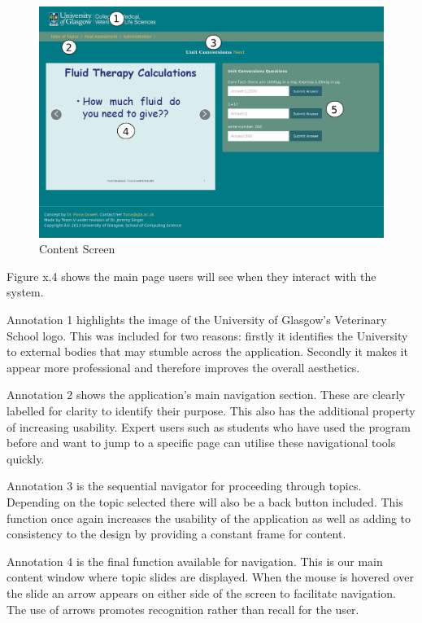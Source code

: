 \documentclass{l3proj}
\begin{document}
\begin{figure}[!htb]
\caption{Content Screen}
\includegraphics[width=\linewidth]{images/topic_page_annotated.png}
\end{figure}

Figure x.4 shows the main page users will see when they interact with the system.

Annotation 1 highlights the image of the University of Glasgow's Veterinary School logo. This was included for two reasons: firstly it identifies the University to external bodies that may stumble across the application. Secondly it makes it appear more professional and therefore improves the overall aesthetics.

Annotation 2 shows the application's main navigation section. These are clearly labelled for clarity to identify their purpose. This also has the additional property of increasing usability. Expert users such as students who have used the program before and want to jump to a specific page can utilise these navigational tools quickly.

Annotation 3 is the sequential navigator for proceeding through topics. Depending on the topic selected there will also be a back button included. This function once again increases the usability of the application as well as adding to consistency to the design by providing a constant frame for content.

Annotation 4 is the final function available for navigation. This is our main content window where topic slides are displayed. When the mouse is hovered over the slide an arrow appears on either side of the screen to facilitate navigation. The use of arrows promotes recognition rather than recall for the user. 
\end{document}
